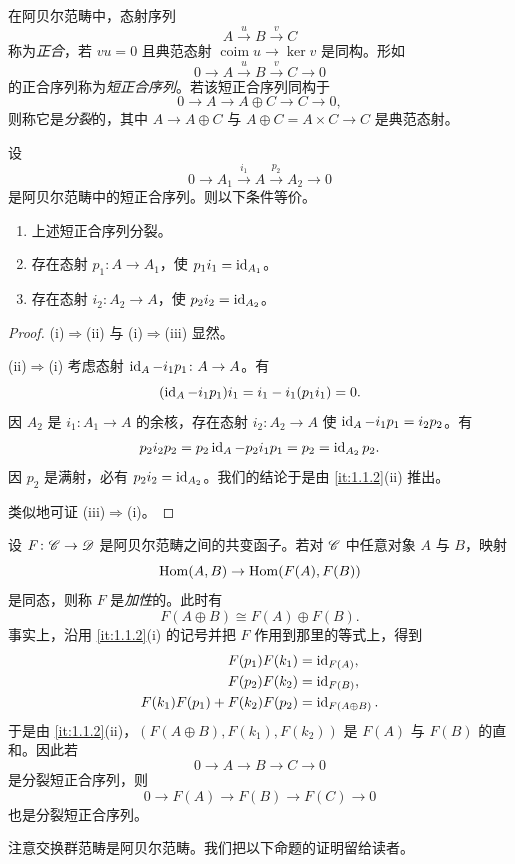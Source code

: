 在阿贝尔范畴中，态射序列
\[
A\xrightarrow{u}B\xrightarrow{v}C
\]
称为\emph{正合}，若 $vu=0$ 且典范态射 $\operatorname{coim}u\to\ker v$ 是同构。形如
\[
0\to A\xrightarrow{u}B\xrightarrow{v}C\to 0
\]
的正合序列称为\emph{短正合序列}。若该短正合序列同构于
\[
0\to A\to A\oplus C\to C\to 0,
\]
则称它是\emph{分裂}的，其中 $A\to A\oplus C$ 与 $A\oplus C=A\times C\to C$ 是典范态射。

\begin{proposition}\label{it:1.1.3}
设
\[
0\to A_1\xrightarrow{i_1}A\xrightarrow{p_2}A_2\to 0
\]
是阿贝尔范畴中的短正合序列。则以下条件等价。
\begin{enumerate}[label=(\roman*),leftmargin=2.8em]
  \item 上述短正合序列分裂。
  \item 存在态射 $p_1\colon A\to A_1$，使 $p_1i_1=\operatorname{id}_{A_1}$。
  \item 存在态射 $i_2\colon A_2\to A$，使 $p_2i_2=\operatorname{id}_{A_2}$。
\end{enumerate}
\end{proposition}

\begin{proof}
(i)$\Rightarrow$(ii) 与 (i)$\Rightarrow$(iii) 显然。

(ii)$\Rightarrow$(i) 考虑态射 $\operatorname{id}_A-i_1p_1\colon A\to A$。有
\[
(\operatorname{id}_A-i_1p_1)i_1=i_1-i_1(p_1i_1)=0.
\]
因 $A_2$ 是 $i_1\colon A_1\to A$ 的余核，存在态射 $i_2\colon A_2\to A$ 使 $\operatorname{id}_A-i_1p_1=i_2p_2$。有
\[
p_2i_2p_2=p_2\operatorname{id}_A-p_2i_1p_1=p_2=\operatorname{id}_{A_2}p_2.
\]
因 $p_2$ 是满射，必有 $p_2i_2=\operatorname{id}_{A_2}$。我们的结论于是由 \ref{it:1.1.2}(ii) 推出。

类似地可证 (iii)$\Rightarrow$(i)。
\end{proof}

设 $F\colon\mathscr{C}\to\mathscr{D}$ 是阿贝尔范畴之间的共变函子。若对 $\mathscr{C}$ 中任意对象 $A$ 与 $B$，映射
\[
\operatorname{Hom}(A,B)\to\operatorname{Hom}(F(A),F(B))
\]
是同态，则称 $F$ 是\emph{加性}的。此时有
\[
F(A\oplus B)\cong F(A)\oplus F(B).
\]
事实上，沿用 \ref{it:1.1.2}(i) 的记号并把 $F$ 作用到那里的等式上，得到
\begin{align*}
F(p_1)F(k_1)&=\operatorname{id}_{F(A)},\\
F(p_2)F(k_2)&=\operatorname{id}_{F(B)},\\
F(k_1)F(p_1)+F(k_2)F(p_2)&=\operatorname{id}_{F(A\oplus B)}.
\end{align*}
于是由 \ref{it:1.1.2}(ii)，$(F(A\oplus B),F(k_1),F(k_2))$ 是 $F(A)$ 与 $F(B)$ 的直和。因此若
\[
0\to A\to B\to C\to 0
\]
是分裂短正合序列，则
\[
0\to F(A)\to F(B)\to F(C)\to 0
\]
也是分裂短正合序列。

注意交换群范畴是阿贝尔范畴。我们把以下命题的证明留给读者。
